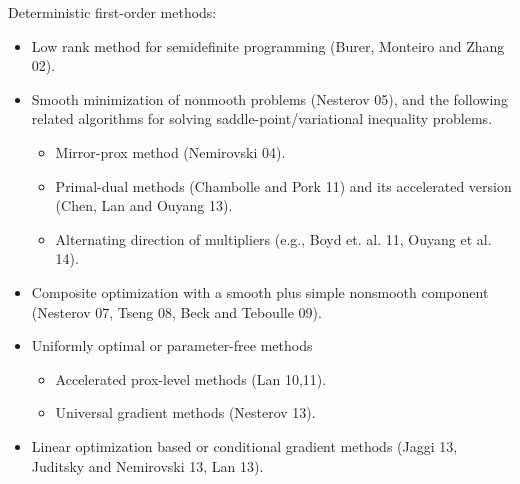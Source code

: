\documentclass[12pt]{article}
\begin{document}
Deterministic first-order methods: 
\begin{itemize}
\item Low rank method for semidefinite programming (Burer, Monteiro and Zhang 02).
\item Smooth minimization of nonmooth problems (Nesterov 05), and the following related
algorithms for solving saddle-point/variational inequality problems.
\begin{itemize}
\item Mirror-prox method (Nemirovski 04). 
\item Primal-dual methods (Chambolle and Pork 11) and its accelerated version (Chen, Lan and Ouyang 13).
\item Alternating direction of multipliers (e.g., Boyd et. al. 11, Ouyang et al. 14).
\end{itemize}
\item Composite optimization with a smooth plus simple nonsmooth component (Nesterov 07, Tseng 08, Beck and Teboulle 09).
\item Uniformly optimal or parameter-free methods 
\begin{itemize}
\item Accelerated prox-level methods (Lan 10,11).
\item Universal gradient methods (Nesterov 13).
\end{itemize}
\item Linear optimization based or conditional gradient methods (Jaggi 13, Juditsky and Nemirovski 13, Lan 13).
\end{itemize}


 

\newpage
\small



\end{document}
